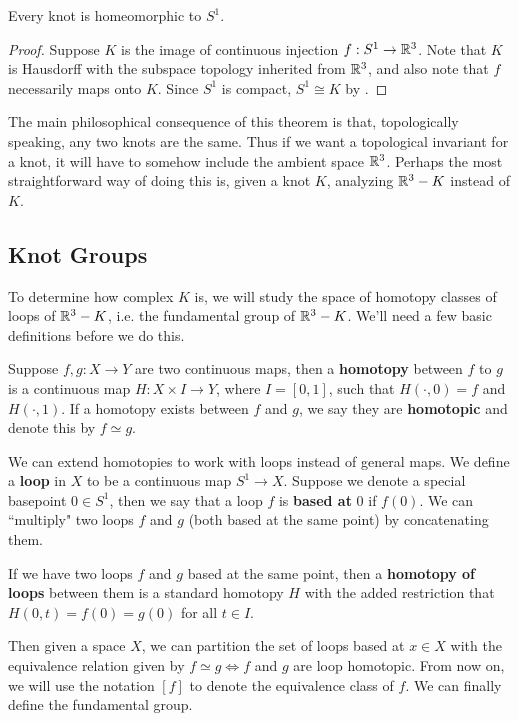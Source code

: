 \documentclass[twoside,10pt]{article}
\begin{document}
\begin{thrm}[]
	Every knot is homeomorphic to $S^{1}$.
\end{thrm}
\begin{proof}
	Suppose $K$ is the image of continuous injection $f:S^{1}\to \mathbb{R}^{3}$. Note that $K$ is Hausdorff with the subspace topology inherited from $\mathbb{R}^{3}$, and also note that $f$ necessarily maps onto $K$. Since $S^{1}$ is compact, $S^{1}\cong K$ by .
\end{proof}

The main philosophical consequence of this theorem is that, topologically speaking, any two knots are the same. Thus if we want a topological invariant for a knot, it will have to somehow include the ambient space $\mathbb{R}^{3}$. Perhaps the most straightforward way of doing this is, given a knot $K$, analyzing $\mathbb{R}^{3}-K$ instead of $K$.

\subsection{Knot Groups}

To determine how complex $K$ is, we will study the space of homotopy classes of loops of $\mathbb{R}^{3}-K$, i.e. the fundamental group of $\mathbb{R}^{3}-K$. We'll need a few basic definitions before we do this.

Suppose $f,g:X\to Y$ are two continuous maps, then a \textbf{homotopy} between $f$ to $g$ is a continuous map $H:X\times I \to Y$, where $I=[0,1]$, such that $H(\cdot,0) = f$ and $H(\cdot,1)$. If a homotopy exists between $f$ and $g$, we say they are \textbf{homotopic} and denote this by $f \simeq g$.

We can extend homotopies to work with loops instead of general maps. We define a \textbf{loop} in $X$ to be a continuous map $S^{1}\to X$. Suppose we denote a special basepoint $0 \in S^{1}$, then we say that a loop $f$ is \textbf{based at} $0$ if $f(0)$. We can ``multiply" two loops $f$ and $g$ (both based at the same point) by concatenating them.

If we have two loops $f$ and $g$ based at the same point, then a \textbf{homotopy of loops} between them is a standard homotopy $H$ with the added restriction that $H(0,t) = f(0)=g(0)$ for all $t \in I$.

Then given a space $X$, we can partition the set of loops based at $x \in X$ with the equivalence relation given by $f \simeq g \iff f$ and $g$ are loop homotopic. From now on, we will use the notation $[f]$ to denote the equivalence class of $f$. We can finally define the fundamental group.
\end{document}
